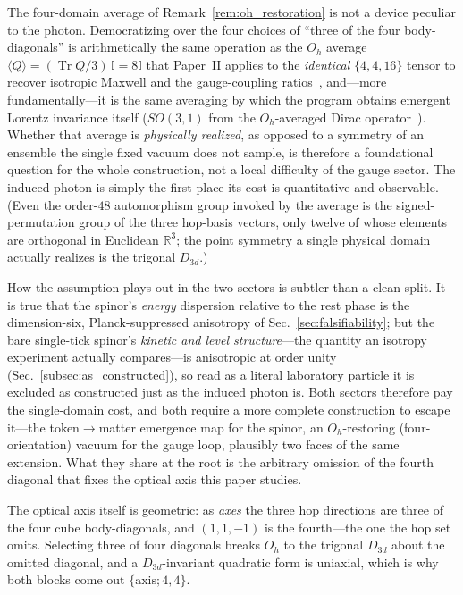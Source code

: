 \begin{remark}
\label{rem:paper2_inheritance}
The four-domain average of Remark~\ref{rem:oh_restoration} is not a device peculiar to
the photon. Democratizing over the four choices of ``three of the four body-diagonals''
is arithmetically the same operation as the $O_h$ average $\langle Q\rangle =
(\operatorname{Tr}Q/3)\,\mathbb{I} = 8\mathbb{I}$ that Paper~II applies to the
\emph{identical} $\{4,4,16\}$ tensor to recover isotropic Maxwell and the gauge-coupling
ratios~\cite{menendez2026smderivation}, and---more fundamentally---it is the same
averaging by which the program obtains emergent Lorentz invariance itself ($SO(3,1)$ from
the $O_h$-averaged Dirac operator~\cite{menendez2026geometryfirst,menendez2026smderivation}).
Whether that average is \emph{physically realized}, as
opposed to a symmetry of an ensemble the single fixed vacuum does not sample, is therefore
a foundational question for the whole construction, not a local difficulty of the gauge
sector. The induced photon is simply the first place its cost is quantitative and
observable. (Even the order-$48$ automorphism group invoked by the average is the
signed-permutation group of the three hop-basis vectors, only twelve of whose elements are
orthogonal in Euclidean $\mathbb{R}^3$; the point symmetry a single physical domain
actually realizes is the trigonal $D_{3d}$.)

How the assumption plays out in the two sectors is subtler than a clean split. It is true
that the spinor's \emph{energy} dispersion relative to the rest phase is the
dimension-six, Planck-suppressed anisotropy of Sec.~\ref{sec:falsifiability}; but the bare
single-tick spinor's \emph{kinetic and level structure}---the quantity an isotropy
experiment actually compares---is anisotropic at order unity
(Sec.~\ref{subsec:as_constructed}), so read as a literal laboratory particle it is
excluded as constructed just as the induced photon is. Both sectors therefore pay the
single-domain cost, and both require a more complete construction to escape it---the
token$\to$matter emergence map for the spinor, an $O_h$-restoring (four-orientation)
vacuum for the gauge loop, plausibly two faces of the same extension. What they share at
the root is the arbitrary omission of the fourth diagonal that fixes the optical axis this
paper studies.
\end{remark}

The optical axis itself is geometric: as \emph{axes} the three hop directions are
three of the four cube body-diagonals, and $(1,1,-1)$ is the fourth---the one the hop
set omits. Selecting three of four diagonals breaks $O_h$ to the trigonal $D_{3d}$
about the omitted diagonal, and a $D_{3d}$-invariant quadratic form is uniaxial,
which is why both blocks come out $\{\text{axis};4,4\}$.

